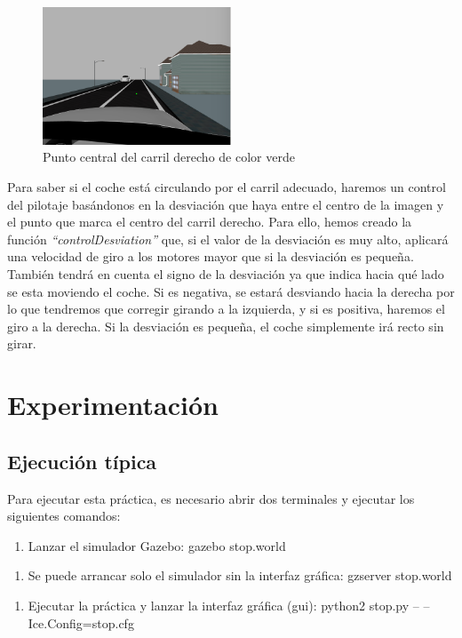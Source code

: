 \begin{figure}[H]
  \begin{center}
    \includegraphics[width=0.5\textwidth]{figures/Stop/desv.png}
		\caption{Punto central del carril derecho de color verde}
		\label{fig.desv}
		\end{center}
\end{figure}

Para saber si el coche está circulando por el carril adecuado, haremos un control del pilotaje basándonos en la desviación que haya entre el centro de la imagen y el punto que marca el centro del carril derecho. Para ello, hemos creado la función \textit{``controlDesviation''} que, si el valor de la desviación es muy alto, aplicará una velocidad de giro a los motores mayor que si la desviación es pequeña. También tendrá en cuenta el signo de la desviación ya que indica hacia qué lado se esta moviendo el coche. Si es negativa, se estará desviando hacia la derecha por lo que tendremos que corregir girando a la izquierda, y si es positiva, haremos el giro a la derecha. Si la desviación es pequeña, el coche simplemente irá recto sin girar.

\section{Experimentación}

\subsection{Ejecución típica} 
Para ejecutar esta práctica, es necesario abrir dos terminales y ejecutar los siguientes comandos:

\begin{enumerate}[1.]
\item Lanzar el simulador Gazebo: gazebo stop.world
\end{enumerate}
\begin{enumerate}[1b.]
\item Se puede arrancar solo el simulador sin la interfaz gráfica: gzserver stop.world
\end{enumerate}
\begin{enumerate}[2.]
\item	Ejecutar la práctica y lanzar la interfaz gráfica (\acrshort{gui}): python2 stop.py -- --Ice.Config=stop.cfg
\end{enumerate}

